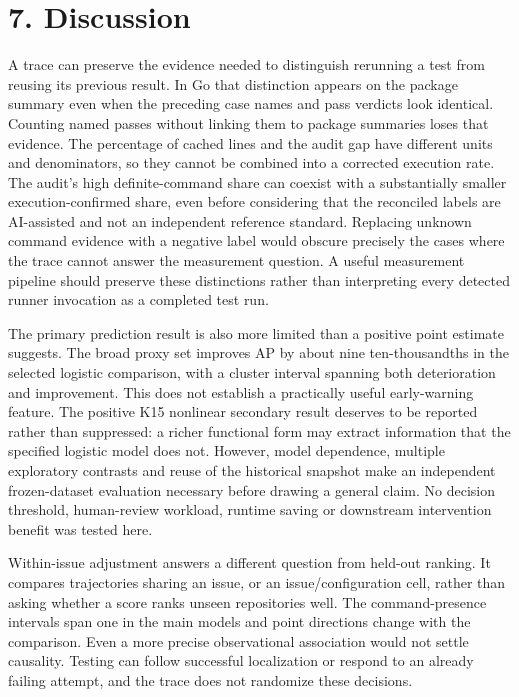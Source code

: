 \documentclass[10pt,a4paper]{article}
\begin{document}
\section{7. Discussion}
A trace can preserve the evidence needed to distinguish rerunning a test from reusing its previous result. In Go that distinction appears on the package summary even when the preceding case names and pass verdicts look identical. Counting named passes without linking them to package summaries loses that evidence. The percentage of cached lines and the audit gap have different units and denominators, so they cannot be combined into a corrected execution rate. The audit's high definite-command share can coexist with a substantially smaller execution-confirmed share, even before considering that the reconciled labels are AI-assisted and not an independent reference standard. Replacing unknown command evidence with a negative label would obscure precisely the cases where the trace cannot answer the measurement question. A useful measurement pipeline should preserve these distinctions rather than interpreting every detected runner invocation as a completed test run.

The primary prediction result is also more limited than a positive point estimate suggests. The broad proxy set improves AP by about nine ten-thousandths in the selected logistic comparison, with a cluster interval spanning both deterioration and improvement. This does not establish a practically useful early-warning feature. The positive K15 nonlinear secondary result deserves to be reported rather than suppressed: a richer functional form may extract information that the specified logistic model does not. However, model dependence, multiple exploratory contrasts and reuse of the historical snapshot make an independent frozen-dataset evaluation necessary before drawing a general claim. No decision threshold, human-review workload, runtime saving or downstream intervention benefit was tested here.

Within-issue adjustment answers a different question from held-out ranking. It compares trajectories sharing an issue, or an issue/configuration cell, rather than asking whether a score ranks unseen repositories well. The command-presence intervals span one in the main models and point directions change with the comparison. Even a more precise observational association would not settle causality. Testing can follow successful localization or respond to an already failing attempt, and the trace does not randomize these decisions.
\end{document}
